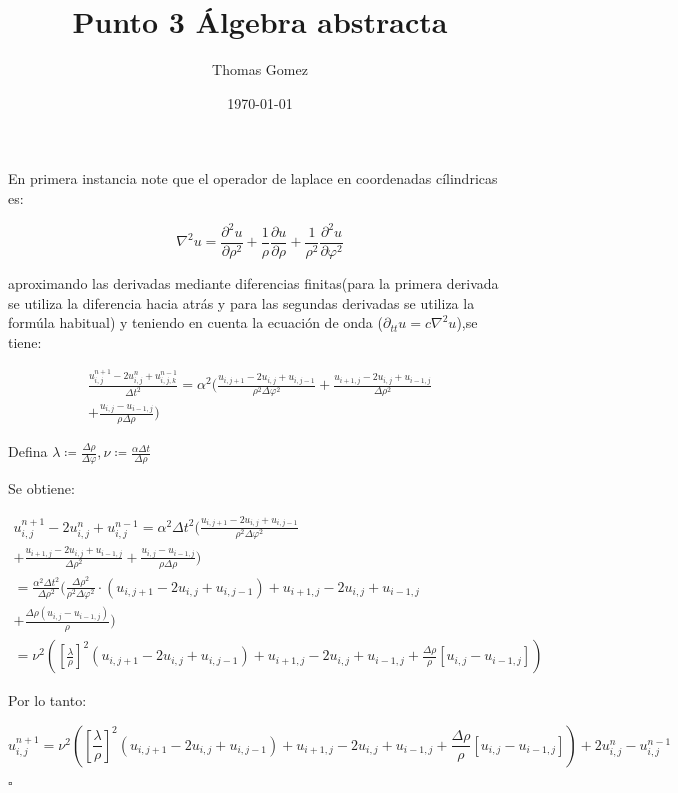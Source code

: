 \documentclass[10pt,a4paper]{article}
\begin{document}
	
	
	\title{Punto 3 Álgebra abstracta}
	\author{Thomas Gomez}
	\date{\today}
	\maketitle
	
	
En primera instancia note que el operador de laplace en coordenadas cílindricas es:

\begin{equation}
\nabla^2 u = \frac{\partial^2 u}{\partial \rho^2} + \frac{1}{\rho}\frac{\partial u}{\partial \rho}+\frac{1}{\rho^2} \frac{\partial^2 u}{\partial \varphi^2}
\end{equation}

aproximando las derivadas mediante diferencias finitas(para la primera derivada se utiliza la diferencia hacia atrás y para las segundas derivadas se utiliza la formúla habitual) y teniendo en cuenta la ecuación de onda ($\partial_{tt} u = c\nabla^2 u $),se tiene:

\begin{equation}
\begin{gathered}
\frac{u_{i,j}^{n+1}-2u_{i,j}^n+u_{i,j,k}^{n-1}}{\Delta t^2} =\alpha^2( \frac{u_{i,j+1}-2u_{i,j}+u_{i,j-1}}{\rho^2 \Delta \varphi^2} + \frac{u_{i+1,j}-2u_{i,j}+u_{i-1,j}}{\Delta \rho^2} \\ + \frac{u_{i,j}-u_{i-1,j}}{\rho \Delta \rho})
\end{gathered}
\end{equation}

Defina $\lambda \coloneq \frac{\Delta \rho}{\Delta \varphi}, \nu \coloneq \frac{\alpha \Delta t}{\Delta \rho}$

Se obtiene:

\begin{equation}
\begin{gathered}
u_{i,j}^{n+1}-2u_{i,j}^n+u_{i,j}^{n-1} = \alpha^2 \Delta t^2( \frac{u_{i,j+1}-2u_{i,j}+u_{i,j-1}}{\rho^2 \Delta \varphi^2} \\
+ \frac{u_{i+1,j}-2u_{i,j}+u_{i-1,j}}{\Delta \rho^2} + \frac{u_{i,j}-u_{i-1,j}}{\rho \Delta \rho})\\
= \frac{\alpha^2 \Delta t^2}{ \Delta \rho^2}( \frac{\Delta \rho^2}{\rho^2\Delta \varphi^2} \cdot (u_{i,j+1}-2u_{i,j}+u_{i,j-1}) + u_{i+1,j}-2u_{i,j}+u_{i-1,j} \\ +\frac{\Delta \rho(u_{i,j}-u_{i-1,j})}{\rho}) \\
= \nu^2 ( [\frac{\lambda}{\rho}]^2 (u_{i,j+1}-2u_{i,j}+u_{i,j-1}) +  u_{i+1,j}-2u_{i,j}+u_{i-1,j} + \frac{\Delta \rho}{\rho} [ u_{i,j} -u_{i-1,j} ] )
\end{gathered}
\end{equation}

Por lo tanto:

\begin{equation}
u_{i,j}^{n+1} = \nu^2 ( [\frac{\lambda}{\rho}]^2 (u_{i,j+1}-2u_{i,j}+u_{i,j-1}) +  u_{i+1,j}-2u_{i,j}+u_{i-1,j} + \frac{\Delta \rho}{\rho} [ u_{i,j} -u_{i-1,j} ] ) + 2u_{i,j}^n-u_{i,j}^{n-1}
\end{equation}

$\square$
\end{document}
